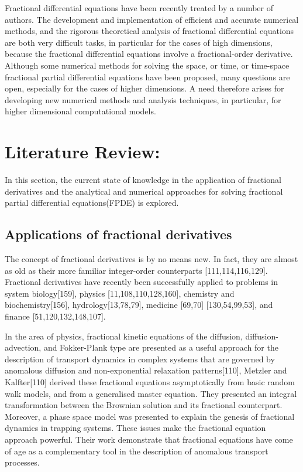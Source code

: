 {Fractional differential equations have been recently treated by a number of authors. The development and implementation of efficient and accurate numerical methods, and the rigorous theoretical analysis of fractional differential equations are both very difficult tasks, in particular for the cases of high dimensions, because the fractional differential equations involve a fractional-order derivative. Although some numerical methods for solving the space, or time, or time-space fractional partial differential equations have been proposed, many questions are open, especially for the cases of higher dimensions. A need therefore arises for developing new numerical methods and analysis techniques, in particular, for higher dimensional computational models.

\chead{}
\section{Literature Review:}

In this section, the current state of knowledge in the application of fractional derivatives and the analytical and numerical approaches for solving fractional partial differential equations(FPDE) is explored.

\subsection{Applications of fractional derivatives}
The concept of fractional derivatives is by no means new. In fact, they are almost as old as their more familiar integer-order counterparts [111,114,116,129]. Fractional derivatives have recently been successfully applied to problems in system biology[159], physics [11,108,110,128,160], chemistry and biochemistry[156], hydrology[13,78,79], medicine [69,70] [130,54,99,53], and finance [51,120,132,148,107].\

In the area of physics, fractional kinetic equations of the diffusion, diffusion-advection, and Fokker-Plank type are presented as a useful approach for the description of transport dynamics in complex systems that are governed by anomalous diffusion and non-exponential relaxation patterns[110], Metzler and Kalfter[110] derived these fractional equations asymptotically from basic random walk models, and from a generalised master equation. They presented an integral transformation between the Brownian solution and its fractional counterpart. Moreover, a phase space model was presented to explain the genesis of fractional dynamics in trapping systems. These issues make the fractional equation approach powerful. Their work demonstrate that fractional equations have come of age as a complementary tool in the description of anomalous transport processes.\

}
